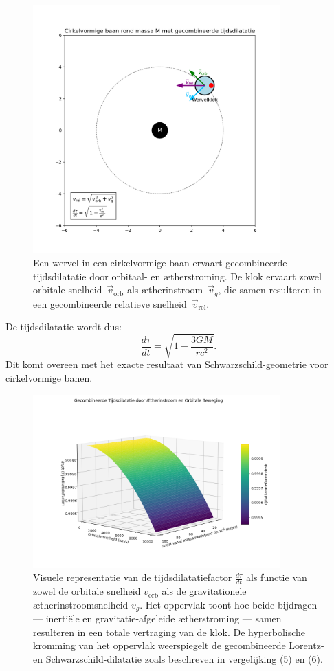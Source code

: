 \begin{figure}[htbp]
    \centering
    \includegraphics[width=0.85\textwidth]{08-BaanRondMassa}
    \caption{Een wervel in een cirkelvormige baan ervaart gecombineerde tijdsdilatatie door orbitaal- en ætherstroming. De klok ervaart zowel orbitale snelheid~$\vec{v}_{\mathrm{orb}}$ als ætherinstroom~$\vec{v}_g$, die samen resulteren in een gecombineerde relatieve snelheid~$\vec{v}_{\mathrm{rel}}$.}
    \label{fig:BaanRondMassa}
\end{figure}

De tijdsdilatatie wordt dus:
\[
    \frac{d\tau}{dt} = \sqrt{1 - \frac{3GM}{rc^2}}. \tag{6}
\]
Dit komt overeen met het exacte resultaat van Schwarzschild-geometrie voor cirkelvormige banen.

\begin{figure}[htbp]
    \centering
    \includegraphics[width=0.85\textwidth]{09-CombinedTimeDilationSurface}
    \caption{Visuele representatie van de tijdsdilatatiefactor \( \frac{d\tau}{dt} \) als functie van zowel de orbitale snelheid \( v_{\text{orb}} \) als de gravitationele ætherinstroomsnelheid \( v_g \). Het oppervlak toont hoe beide bijdragen — inertiële en gravitatie-afgeleide ætherstroming — samen resulteren in een totale vertraging van de klok. De hyperbolische kromming van het oppervlak weerspiegelt de gecombineerde Lorentz- en Schwarzschild-dilatatie zoals beschreven in vergelijking (5) en (6).}
    \label{fig:TimeDialationCombined}
\end{figure}

